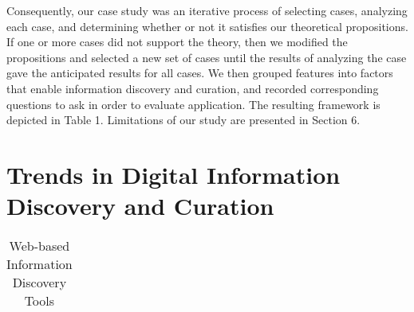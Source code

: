 \documentclass{casconpaper}
\begin{document}
{Consequently, our case study was an iterative process of selecting cases, analyzing each case, and determining whether or not it satisfies our theoretical propositions. If one or more cases did not support the theory, then we modified the propositions and selected a new set of cases until the results of analyzing the case gave the anticipated results for all cases. We then grouped features into factors that enable information discovery and curation, and recorded corresponding questions to ask in order to evaluate application. The resulting framework is depicted in Table 1. Limitations of our study are presented in Section 6.
} %


{\section{Trends in Digital Information Discovery and Curation}
\begin{table*}[htbp]
\small

\caption{Web-based Information Discovery Tools}

\begin{tabular}{|p{0.11\linewidth}| p{0.22\linewidth}| p{0.66\linewidth}|}


\end{tabular}
\end{table*}}
\end{document}
